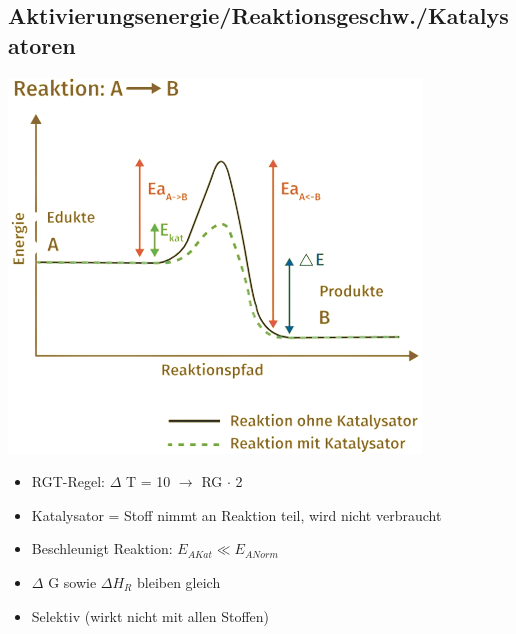 \subsection{Aktivierungsenergie/Reaktionsgeschw./Katalysatoren}
\begin{minipage}[t]{0.3\linewidth}
    \vspace*{0pt}
    \includegraphics[width=\linewidth]{pictures/Katalysator.png}
\end{minipage}
\begin{minipage}[t]{0.7\linewidth}
    \begin{itemize}
        \item RGT-Regel: $\Delta$ T = 10 $\rightarrow$ RG $\cdot$ 2
        \item Katalysator = Stoff nimmt an Reaktion teil, wird nicht verbraucht 
        \item Beschleunigt Reaktion: $E_{AKat} \ll E_{ANorm}$
        \item $\Delta$ G sowie $\Delta H_R$ bleiben gleich
        \item Selektiv (wirkt nicht mit allen Stoffen)
    \end{itemize}
\end{minipage}
